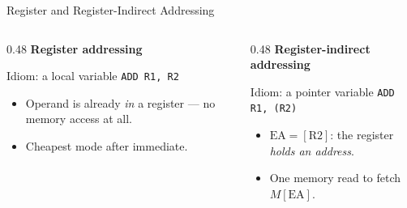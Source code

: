 \documentclass[aspectratio=169]{beamer}
\begin{document}
\begin{frame}{Register and Register-Indirect Addressing}
  \begin{columns}[T]
    \begin{column}{0.48\textwidth}
      \textbf{Register addressing}
      \begin{exampleblock}{Idiom: a local variable}
        \texttt{ADD R1, R2}
      \end{exampleblock}
      \begin{itemize}
        \item Operand is already \emph{in} a register --- no memory access at all.
        \item Cheapest mode after immediate.
      \end{itemize}
    \end{column}
    \begin{column}{0.48\textwidth}
      \textbf{Register-indirect addressing}
      \begin{exampleblock}{Idiom: a pointer variable}
        \texttt{ADD R1, (R2)}
      \end{exampleblock}
      \begin{itemize}
        \item $\text{EA} = [\text{R2}]$: the register \emph{holds an address}.
        \item One memory read to fetch $M[\text{EA}]$.
      \end{itemize}
    \end{column}
  \end{columns}
  \vspace{0.3cm}
\end{frame}
\end{document}
